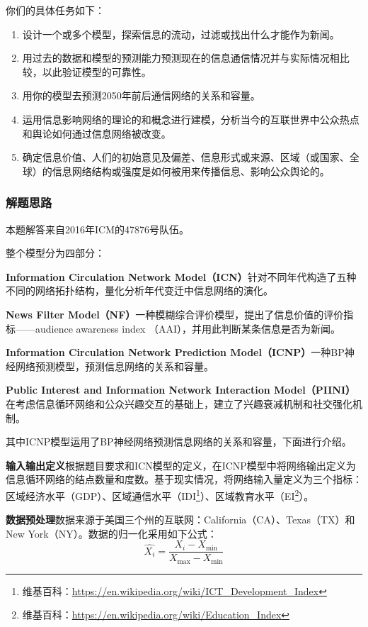 \documentclass[bwprint]{cumcmthesis}
\begin{document}
\begin{shaded}
{\noindent 你们的具体任务如下：
\begin{enumerate}
\item 设计一个或多个模型，探索信息的流动，过滤或找出什么才能作为新闻。
\item 用过去的数据和模型的预测能力预测现在的信息通信情况并与实际情况相比较，以此验证模型的可靠性。
\item 用你的模型去预测2050年前后通信网络的关系和容量。
\item 运用信息影响网络的理论的和概念进行建模，分析当今的互联世界中公众热点和舆论如何通过信息网络被改变。
\item 确定信息价值、人们的初始意见及偏差、信息形式或来源、区域（或国家、全球）的信息网络结构或强度是如何被用来传播信息、影响公众舆论的。
\end{enumerate}
}

\end{shaded}

\subsubsection{解题思路}
本题解答来自2016年ICM的47876号队伍。

整个模型分为四部分：

\textbf{Information Circulation Network Model（ICN）}\quad 针对不同年代构造了五种不同的网络拓扑结构，量化分析年代变迁中信息网络的演化。

\textbf{News Filter Model（NF）}\quad 一种模糊综合评价模型，提出了信息价值的评价指标——audience awareness index （AAI），并用此判断某条信息是否为新闻。

\textbf{Information Circulation Network Prediction Model（ICNP）}\quad 一种BP神经网络预测模型，预测信息网络的关系和容量。

\textbf{Public Interest and Information Network Interaction Model（PIINI）}\quad 在考虑信息循环网络和公众兴趣交互的基础上，建立了兴趣衰减机制和社交强化机制。

其中ICNP模型运用了BP神经网络预测信息网络的关系和容量，下面进行介绍。

\textbf{输入输出定义}\quad 根据题目要求和ICN模型的定义，在ICNP模型中将网络输出定义为信息循环网络的结点数量和度数。基于现实情况，将网络输入量定义为三个指标：区域经济水平（GDP）、区域通信水平（IDI\footnote{维基百科：\url{https://en.wikipedia.org/wiki/ICT_Development_Index}}）、区域教育水平（EI\footnote{维基百科：\url{https://en.wikipedia.org/wiki/Education_Index}}）。

\textbf{数据预处理}\quad 数据来源于美国三个州的互联网：California（CA）、Texas（TX）和New York（NY）。数据的归一化采用如下公式：
\[\hat{X_i} = \frac{X_i - X_{\min}}{X_{\max} - X_{\min}}\]
\end{document}
